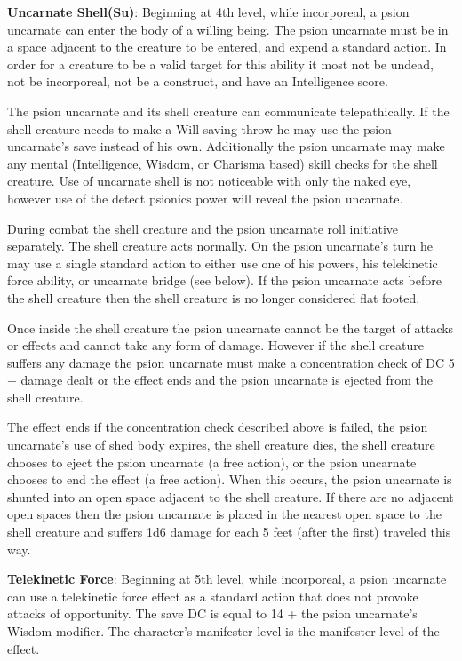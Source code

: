 \textbf{Uncarnate Shell(Su)}: Beginning at 4th level, while incorporeal, a psion uncarnate can enter the body of a willing being. The psion uncarnate must be in a space adjacent to the creature to be entered, and expend a standard action. In order for a creature to be a valid target for this ability it most not be undead, not be incorporeal, not be a construct, and have an Intelligence score.

The psion uncarnate and its shell creature can communicate telepathically. If the shell creature needs to make a Will saving throw he may use the psion uncarnate's save instead of his own. Additionally the psion uncarnate may make any mental (Intelligence, Wisdom, or Charisma based) skill checks for the shell creature. Use of uncarnate shell is not noticeable with only the naked eye, however use of the detect psionics power will reveal the psion uncarnate.

During combat the shell creature and the psion uncarnate roll initiative separately. The shell creature acts normally. On the psion uncarnate's turn he may use a single standard action to either use one of his powers, his telekinetic force ability, or uncarnate bridge (see below). If the psion uncarnate acts before the shell creature then the shell creature is no longer considered flat footed.

Once inside the shell creature the psion uncarnate cannot be the target of attacks or effects and cannot take any form of damage. However if the shell creature suffers any damage the psion uncarnate must make a concentration check of DC 5 + damage dealt or the effect ends and the psion uncarnate is ejected from the shell creature.

The effect ends if the concentration check described above is failed, the psion uncarnate's use of shed body expires, the shell creature dies, the shell creature chooses to eject the psion uncarnate (a free action), or the psion uncarnate chooses to end the effect (a free action). When this occurs, the psion uncarnate is shunted into an open space adjacent to the shell creature. If there are no adjacent open spaces then the psion uncarnate is placed in the nearest open space to the shell creature and suffers 1d6 damage for each 5 feet (after the first) traveled this way.

\textbf{Telekinetic Force}: Beginning at 5th level, while incorporeal, a psion uncarnate can use a telekinetic force effect as a standard action that does not provoke attacks of opportunity. The save DC is equal to 14 + the psion uncarnate's Wisdom modifier. The character's manifester level is the manifester level of the effect.

